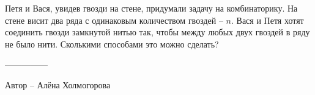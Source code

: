 \question
Петя и Вася, увидев гвозди на стене, придумали задачу на комбинаторику. На стене висит два ряда с одинаковым количеством гвоздей -- $n$. Вася и Петя хотят соединить гвозди замкнутой нитью так, чтобы между любых двух гвоздей в ряду не было нити. Сколькими способами это можно сделать?

---------------

Автор -- Алёна Холмогорова
